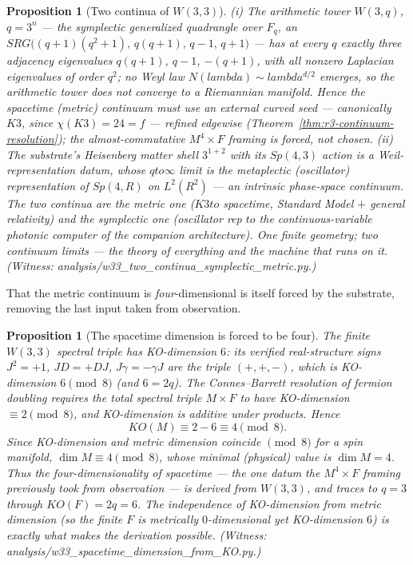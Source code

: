 \documentclass[12pt,a4paper]{article}
\def\mathbb#1{#1}%
\def\mathrm#1{#1}%
\def\texttt#1{#1}%
\def\lambda{lambda}%
\def\to{ to }%
\newtheorem{proposition}[theorem]{Proposition}
\theoremstyle{definition}
\begin{document}
\begin{proposition}[Two continua of $W(3,3)$]
\label{prop:two-continua}
\textup{(i)} The arithmetic tower $W(3,q)$, $q=3^n$ --- the symplectic
generalized quadrangle over $\mathbb F_q$, an
$\mathrm{SRG}\big((q{+}1)(q^2{+}1),\,q(q{+}1),\,q{-}1,\,q{+}1\big)$ --- has at
every $q$ \emph{exactly three} adjacency eigenvalues $q(q{+}1)$, $q{-}1$,
$-(q{+}1)$, with all nonzero Laplacian eigenvalues of order $q^2$; no Weyl law
$N(\lambda)\sim\lambda^{d/2}$ emerges, so the arithmetic tower does \emph{not}
converge to a Riemannian manifold. Hence the spacetime (metric) continuum
\emph{must} use an external curved seed --- canonically $K3$, since
$\chi(K3)=24=f$ --- refined edgewise
(Theorem~\ref{thm:r3-continuum-resolution}); the almost-commutative $M^4\times F$
framing is forced, not chosen. \textup{(ii)} The substrate's Heisenberg matter
shell $3^{1+2}$ with its $\mathrm{Sp}(4,3)$ action is a Weil-representation
datum, whose $q\to\infty$ limit is the metaplectic (oscillator) representation
of $\mathrm{Sp}(4,\mathbb R)$ on $L^2(\mathbb R^2)$ --- an \emph{intrinsic}
phase-space continuum. The two continua are the metric one
($K3\to$ spacetime, Standard Model $+$ general relativity) and the symplectic
one (oscillator rep $\to$ the continuous-variable photonic computer of the
companion architecture). One finite geometry; two continuum limits ---
the theory of everything and the machine that runs on it.
\textup{(Witness: \texttt{analysis/w33\_two\_continua\_symplectic\_metric.py}.)}
\end{proposition}

That the metric continuum is \emph{four}-dimensional is itself forced by the
substrate, removing the last input taken from observation.

\begin{proposition}[The spacetime dimension is forced to be four]
\label{prop:spacetime-dim-from-KO}
The finite $W(3,3)$ spectral triple has KO-dimension $6$: its verified
real-structure signs $J^2=+1$, $JD=+DJ$, $J\gamma=-\gamma J$ are the triple
$(+,+,-)$, which is KO-dimension $6\pmod 8$ (and $6=2q$). The Connes--Barrett
resolution of fermion doubling requires the total spectral triple $M\times F$
to have KO-dimension $\equiv 2\pmod 8$, and KO-dimension is additive under
products. Hence
\[
  \mathrm{KO}(M)\equiv 2-6\equiv 4\pmod 8 .
\]
Since KO-dimension and metric dimension coincide $\pmod 8$ for a spin manifold,
$\dim M\equiv 4\pmod 8$, whose minimal (physical) value is $\dim M=4$. Thus the
four-dimensionality of spacetime --- the one datum the $M^4\times F$ framing
previously took from observation --- is \emph{derived} from $W(3,3)$, and traces
to $q=3$ through $\mathrm{KO}(F)=2q=6$. The independence of KO-dimension from
metric dimension (so the finite $F$ is metrically $0$-dimensional yet
KO-dimension $6$) is exactly what makes the derivation possible. (Witness:
\texttt{analysis/w33\_spacetime\_dimension\_from\_KO.py}.)
\end{proposition}
\end{document}
